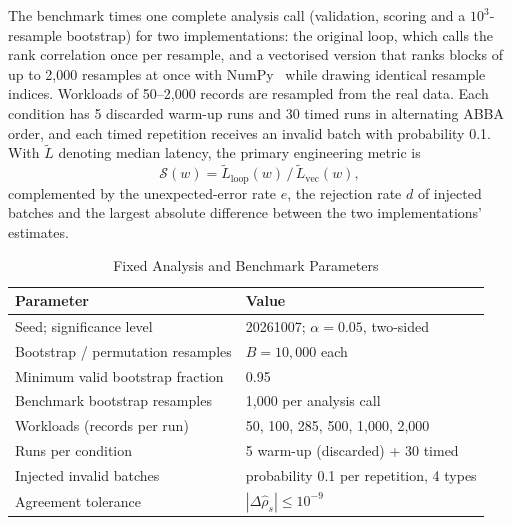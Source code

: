 The benchmark times one complete analysis call (validation, scoring and a $10^3$-resample bootstrap) for two implementations: the original loop, which calls the rank correlation once per resample, and a vectorised version that ranks blocks of up to 2{,}000 resamples at once with NumPy~\cite{harris2020numpy} while drawing identical resample indices. Workloads of 50--2{,}000 records are resampled from the real data. Each condition has 5 discarded warm-up runs and 30 timed runs in alternating ABBA order, and each timed repetition receives an invalid batch with probability 0.1. With $\tilde L$ denoting median latency, the primary engineering metric is
\begin{equation}
\mathcal{S}(w)=\tilde L_{\text{loop}}(w)\,/\,\tilde L_{\text{vec}}(w), \label{eq:speedup}
\end{equation}
complemented by the unexpected-error rate $e$, the rejection rate $d$ of injected batches and the largest absolute difference between the two implementations' estimates.

\begin{table}[!t]
\caption{Fixed Analysis and Benchmark Parameters}
\label{tab:params}
\centering
\footnotesize
\begin{tabular}{@{}ll@{}}
\toprule
Parameter & Value \\
\midrule
Seed; significance level & 20261007; $\alpha=0.05$, two-sided \\
Bootstrap / permutation resamples & $B=10{,}000$ each \\
Minimum valid bootstrap fraction & 0.95 \\
Benchmark bootstrap resamples & 1{,}000 per analysis call \\
Workloads (records per run) & 50, 100, 285, 500, 1{,}000, 2{,}000 \\
Runs per condition & 5 warm-up (discarded) + 30 timed \\
Injected invalid batches & probability 0.1 per repetition, 4 types \\
Agreement tolerance & $|\Delta\hat\rho_s|\le10^{-9}$ \\
\bottomrule
\end{tabular}
\end{table}
